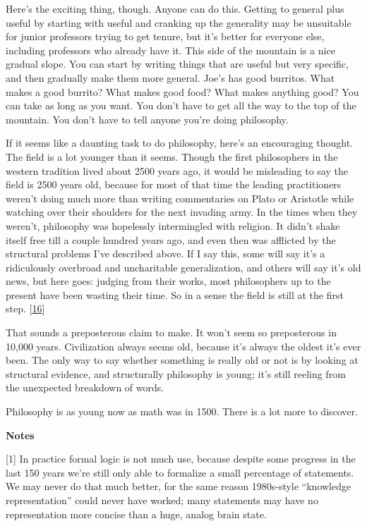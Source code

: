 Here's the exciting thing, though. Anyone can do this. Getting to
general plus useful by starting with useful and cranking up the
generality may be unsuitable for junior professors trying to get tenure,
but it's better for everyone else, including professors who already have
it. This side of the mountain is a nice gradual slope. You can start by
writing things that are useful but very specific, and then gradually
make them more general. Joe's has good burritos. What makes a good
burrito? What makes good food? What makes anything good? You can take as
long as you want. You don't have to get all the way to the top of the
mountain. You don't have to tell anyone you're doing philosophy.

If it seems like a daunting task to do philosophy, here's an encouraging
thought. The field is a lot younger than it seems. Though the first
philosophers in the western tradition lived about 2500 years ago, it
would be misleading to say the field is 2500 years old, because for most
of that time the leading practitioners weren't doing much more than
writing commentaries on Plato or Aristotle while watching over their
shoulders for the next invading army. In the times when they weren't,
philosophy was hopelessly intermingled with religion. It didn't shake
itself free till a couple hundred years ago, and even then was afflicted
by the structural problems I've described above. If I say this, some
will say it's a ridiculously overbroad and uncharitable generalization,
and others will say it's old news, but here goes: judging from their
works, most philosophers up to the present have been wasting their time.
So in a sense the field is still at the first step.
{[}\hyperref[f16n]{16}{]}

That sounds a preposterous claim to make. It won't seem so preposterous
in 10,000 years. Civilization always seems old, because it's always the
oldest it's ever been. The only way to say whether something is really
old or not is by looking at structural evidence, and structurally
philosophy is young; it's still reeling from the unexpected breakdown of
words.

Philosophy is as young now as math was in 1500. There is a lot more to
discover.

\textbf{Notes}

{[}1{]} In practice formal logic is not much use, because despite some
progress in the last 150 years we're still only able to formalize a
small percentage of statements. We may never do that much better, for
the same reason 1980s-style ``knowledge representation'' could never
have worked; many statements may have no representation more concise
than a huge, analog brain state.

